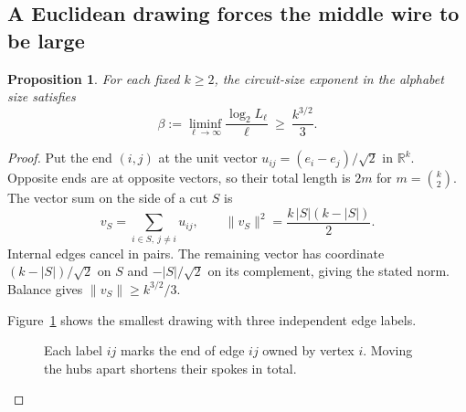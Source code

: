 \documentclass[11pt,letterpaper]{article}
\newtheorem{proposition}[theorem]{Proposition}
\theoremstyle{importstyle}
\newcommand{\norm}[1]{\lVert#1\rVert}
\begin{document}
\subsection*{A Euclidean drawing forces the middle wire to be large}

\begin{proposition}\label{prop:wire}
For each fixed \(k\ge2\), the circuit-size exponent in the alphabet size
satisfies
\[
   \beta:=\liminf_{\ell\to\infty}\frac{\log_2 L_\ell}{\ell}
                      \ \ge\ \frac{k^{3/2}}{3}.
\]
\end{proposition}
\begin{proof}
Put the end \((i,j)\) at the unit vector
\(u_{ij}=(e_i-e_j)/\sqrt2\) in \(\mathbb R^k\).
Opposite ends are at opposite vectors, so their total length is \(2m\) for
\(m=\binom{k}{2}\). The vector sum on the side of a cut \(S\) is
\[
  v_S=\sum_{i\in S,\ j\ne i}u_{ij},\qquad
  \norm{v_S}^2=\frac{k\,|S|(k-|S|)}2 .
\]
Internal edges cancel in pairs. The remaining vector has coordinate
\((k-|S|)/\sqrt2\) on \(S\) and \(-|S|/\sqrt2\) on its complement,
giving the stated norm. Balance gives \(\norm{v_S}\ge k^{3/2}/3\).

Figure~\ref{fig:hubs} shows the smallest drawing with three independent
edge labels.

\begin{figure}[ht]
\centering
{}
\caption{Each label \(ij\) marks the end of edge \(ij\) owned by vertex
\(i\). Moving the hubs apart shortens their spokes in total.}
\label{fig:hubs}
\end{figure}


\end{proof}
\end{document}
